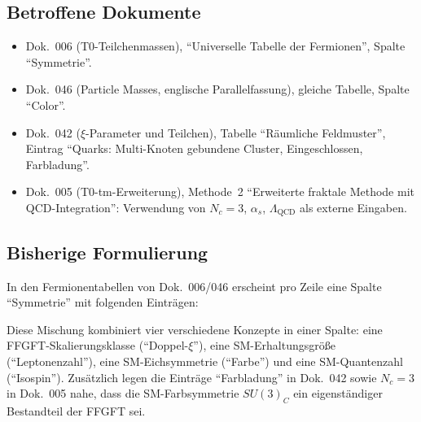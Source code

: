 \subsection*{Betroffene Dokumente}

\begin{itemize}
  \item Dok.~006 (T0-Teilchenmassen), \enquote{Universelle Tabelle der
        Fermionen}, Spalte \enquote{Symmetrie}.
  \item Dok.~046 (Particle Masses, englische Parallelfassung), gleiche
        Tabelle, Spalte \enquote{Color}.
  \item Dok.~042 ($\xi$-Parameter und Teilchen), Tabelle
        \enquote{Räumliche Feldmuster}, Eintrag
        \enquote{Quarks: Multi-Knoten gebundene Cluster, Eingeschlossen, Farbladung}.
  \item Dok.~005 (T0-tm-Erweiterung), Methode~2 \enquote{Erweiterte
        fraktale Methode mit QCD-Integration}: Verwendung von
        $N_c = 3$, $\alpha_s$, $\Lambda_{\text{QCD}}$ als
        externe Eingaben.
\end{itemize}

\subsection*{Bisherige Formulierung}

In den Fermionentabellen von Dok.~006/046 erscheint pro Zeile eine
Spalte \enquote{Symmetrie} mit folgenden Einträgen:
\begin{center}
{\footnotesize
{}
}
\end{center}

Diese Mischung kombiniert vier verschiedene Konzepte in einer Spalte:
eine FFGFT-Skalierungsklasse (\enquote{Doppel-$\xi$}), eine
SM-Erhaltungsgröße (\enquote{Leptonenzahl}), eine SM-Eichsymmetrie
(\enquote{Farbe}) und eine SM-Quantenzahl (\enquote{Isospin}).
Zusätzlich legen die Einträge \enquote{Farbladung} in Dok.~042 sowie
$N_c = 3$ in Dok.~005 nahe, dass die SM-Farbsymmetrie $SU(3)_C$ ein
eigenständiger Bestandteil der FFGFT sei.

